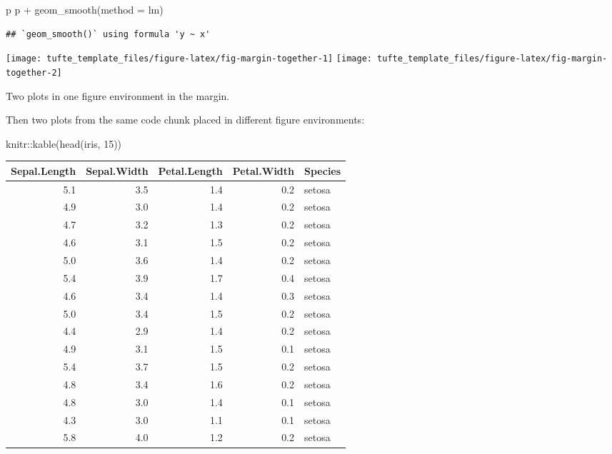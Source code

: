 \documentclass[a4paper,14pt]{tufte-handout}
\newenvironment{Shaded}{}{}
\newcommand{\AttributeTok}[1]{\textcolor[rgb]{0.49,0.56,0.16}{#1}}
\newcommand{\DecValTok}[1]{\textcolor[rgb]{0.25,0.63,0.44}{#1}}
\newcommand{\FunctionTok}[1]{\textcolor[rgb]{0.02,0.16,0.49}{#1}}
\newcommand{\NormalTok}[1]{#1}
\newcommand{\SpecialCharTok}[1]{\textcolor[rgb]{0.25,0.44,0.63}{#1}}
\newcommand{\StringTok}[1]{\textcolor[rgb]{0.25,0.44,0.63}{#1}}
\begin{document}
\begin{Shaded}
\begin{Highlighting}[numbers=left,,]
\NormalTok{p}
\NormalTok{p }\SpecialCharTok{+} \FunctionTok{geom\_smooth}\NormalTok{(}\AttributeTok{method =} \StringTok{\textquotesingle{}lm\textquotesingle{}}\NormalTok{)}
\end{Highlighting}
\end{Shaded}

\begin{verbatim}
## `geom_smooth()` using formula 'y ~ x'
\end{verbatim}

\begin{marginfigure}

{\centering \texttt{[image: tufte\_template\_files/figure-latex/fig-margin-together-1]} \texttt{[image: tufte\_template\_files/figure-latex/fig-margin-together-2]} 

}

\caption[Two plots in one figure environment in the margin]{Two plots in one figure environment in the margin.}\label{fig:fig-margin-together}
\end{marginfigure}

Then two plots from the same code chunk placed in different figure
environments:

\begin{Shaded}
\begin{Highlighting}[numbers=left,,]
\NormalTok{knitr}\SpecialCharTok{::}\FunctionTok{kable}\NormalTok{(}\FunctionTok{head}\NormalTok{(iris, }\DecValTok{15}\NormalTok{))}
\end{Highlighting}
\end{Shaded}

\begin{tabular}{r|r|r|r|l}
\hline
Sepal.Length & Sepal.Width & Petal.Length & Petal.Width & Species\\
\hline
5.1 & 3.5 & 1.4 & 0.2 & setosa\\
\hline
4.9 & 3.0 & 1.4 & 0.2 & setosa\\
\hline
4.7 & 3.2 & 1.3 & 0.2 & setosa\\
\hline
4.6 & 3.1 & 1.5 & 0.2 & setosa\\
\hline
5.0 & 3.6 & 1.4 & 0.2 & setosa\\
\hline
5.4 & 3.9 & 1.7 & 0.4 & setosa\\
\hline
4.6 & 3.4 & 1.4 & 0.3 & setosa\\
\hline
5.0 & 3.4 & 1.5 & 0.2 & setosa\\
\hline
4.4 & 2.9 & 1.4 & 0.2 & setosa\\
\hline
4.9 & 3.1 & 1.5 & 0.1 & setosa\\
\hline
5.4 & 3.7 & 1.5 & 0.2 & setosa\\
\hline
4.8 & 3.4 & 1.6 & 0.2 & setosa\\
\hline
4.8 & 3.0 & 1.4 & 0.1 & setosa\\
\hline
4.3 & 3.0 & 1.1 & 0.1 & setosa\\
\hline
5.8 & 4.0 & 1.2 & 0.2 & setosa\\
\hline
\end{tabular}
\end{document}
